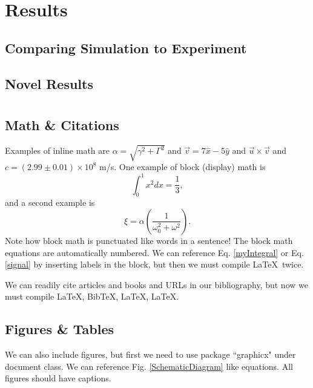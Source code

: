 \documentclass{book}
\begin{document}
\chapter{Results}
\section{Comparing Simulation to Experiment}
\section{Novel Results}

\chapter{}

\section{Math \& Citations}	%
Examples of inline math are $\alpha = \sqrt{\gamma^2 + \Gamma^2}$ and $\vec{v} = 7 \hat{x} - 5 \hat{y}$ and $\vec u \times \vec v$ and $c = (2.99 \pm 0.01) \times 10^8$ m/s. One example of block (display) math is
%
\begin{equation}
	\int_0^1x^2 dx = \frac{1}{3},
	\label{myIntegral}
\end{equation}
%
and a second example is
%
\begin{equation}
	\xi = \alpha \left( \frac{1}{ \omega_0^2 + \omega^2 } \right).
	\label{signal}
\end{equation}
%
Note how block math is punctuated like words in a sentence! The block math equations are automatically numbered. We can reference Eq. \ref{myIntegral} or Eq. \ref{signal} by inserting labels in the block, but then we must compile \LaTeX\ twice.

We can readily cite articles \cite{Chenciner2000}  and books \cite{Gleick1987} and URLs \cite{Lindner2015} in our bibliography, but now we must compile \LaTeX, Bib\TeX,  \LaTeX, \LaTeX.

\section{Figures \& Tables}
We can also include figures, but first we need to use package ``graphicx" under document class. We can reference Fig. \ref{SchematicDiagram} like equations. All figures should have captions.
\end{document}
